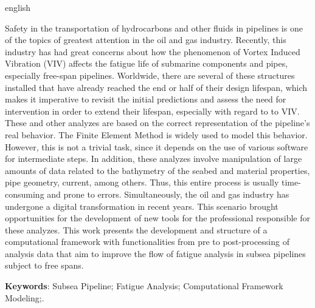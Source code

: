 \begin{resumo}[Abstract]
    \begin{otherlanguage*}{english}

    Safety in the transportation of hydrocarbons and other fluids in pipelines is one of the topics of greatest attention in the oil and gas industry.
    Recently, this industry has had great concerns about how the phenomenon of Vortex Induced Vibration (VIV) affects the fatigue life of submarine components and pipes, especially free-span pipelines.
    Worldwide, there are several of these structures installed that have already reached the end or half of their design lifespan, which makes it imperative to revisit the initial predictions and assess the need for intervention in order to extend their lifespan, especially with regard to to VIV.
    These and other analyzes are based on the correct representation of the pipeline's real behavior.
    The Finite Element Method is widely used to model this behavior.
    However, this is not a trivial task, since it depends on the use of various software for intermediate steps.
    In addition, these analyzes involve manipulation of large amounts of data related to the bathymetry of the seabed and material properties, pipe geometry, current, among others.
    Thus, this entire process is usually time-consuming and prone to errors.
    Simultaneously, the oil and gas industry has undergone a digital transformation in recent years.
    This scenario brought opportunities for the development of new tools for the professional responsible for these analyzes.
    This work presents the development and structure of a computational framework with functionalities from pre to post-processing of analysis data that aim to improve the flow of fatigue analysis in subsea pipelines subject to free spans.

    \vspace{\onelineskip}

    \noindent
    \textbf{Keywords}: Subsea Pipeline; Fatigue Analysis; Computational Framework Modeling;.
    \end{otherlanguage*}
\end{resumo}